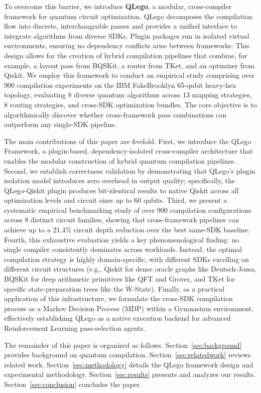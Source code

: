 \documentclass[conference]{IEEEtran}
\begin{document}
To overcome this barrier, we introduce \textbf{QLego}, a modular, cross-compiler framework for quantum circuit optimization. QLego decomposes the compilation flow into discrete, interchangeable passes and provides a unified interface to integrate algorithms from diverse SDKs. Plugin packages run in isolated virtual environments, ensuring no dependency conflicts arise between frameworks. This design allows for the creation of hybrid compilation pipelines that combine, for example, a layout pass from BQSKit, a router from TKet, and an optimizer from Qiskit. We employ this framework to conduct an empirical study comprising over 900 compilation experiments on the IBM FakeBrooklyn 65-qubit heavy-hex topology, evaluating 8 diverse quantum algorithms across 13 mapping strategies, 8 routing strategies, and cross-SDK optimization bundles. The core objective is to algorithmically discover whether cross-framework pass combinations can outperform any single-SDK pipeline.

The main contributions of this paper are fivefold. First, we introduce the QLego Framework, a plugin-based, dependency-isolated cross-compiler architecture that enables the modular construction of hybrid quantum compilation pipelines. Second, we establish correctness validation by demonstrating that QLego's plugin isolation model introduces zero overhead in output quality; specifically, the QLego-Qiskit plugin produces bit-identical results to native Qiskit across all optimization levels and circuit sizes up to 60 qubits. Third, we present a systematic empirical benchmarking study of over 900 compilation configurations across 8 distinct circuit families, showing that cross-framework pipelines can achieve up to a 21.4\% circuit depth reduction over the best same-SDK baseline. Fourth, this exhaustive evaluation yields a key phenomenological finding: no single compiler consistently dominates across workloads. Instead, the optimal compilation strategy is highly domain-specific, with different SDKs excelling on different circuit structures (e.g., Qiskit for dense oracle graphs like Deutsch-Jozsa, BQSKit for deep arithmetic primitives like QFT and Grover, and TKet for specific state-preparation trees like the W-State). Finally, as a practical application of this infrastructure, we formulate the cross-SDK compilation process as a Markov Decision Process (MDP) within a Gymnasium environment, effectively establishing QLego as a native execution backend for advanced Reinforcement Learning pass-selection agents.

The remainder of this paper is organized as follows. Section~\ref{sec:background} provides background on quantum compilation. Section~\ref{sec:relatedwork} reviews related work. Section~\ref{sec:methodology} details the QLego framework design and experimental methodology. Section~\ref{sec:results} presents and analyzes our results. Section~\ref{sec:conclusion} concludes the paper.
\end{document}
